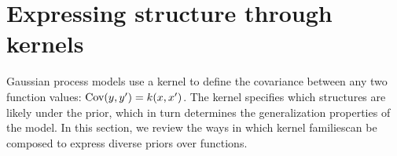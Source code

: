 \documentclass[twoside]{article}
\begin{document}

\section{Expressing structure through kernels} 
\label{sec:Structure}


Gaussian process models use a kernel to define the covariance between any two function values: ${\textrm{Cov}(y, y') = k(x,x')}$.
The kernel specifies which structures are likely under the \gp{} prior, which in turn determines the generalization properties of the model.
%
%
In this section, we review the ways in which kernel families\footnotemark can be composed to express diverse priors over functions. 
\end{document}
